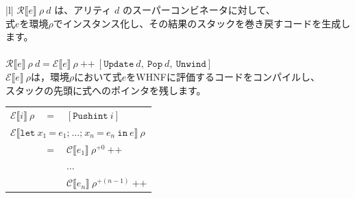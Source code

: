 \documentclass{jbook}
\begin{document}
\begin{tabular} {|l|} \hline
	$\mathcal{R}\llbracket e \rrbracket ~ \rho ~ d$ は、アリティ $d$ のスーパーコンビネータに対して、                                                                          \\
	式$e$を環境$\rho$でインスタンス化し、その結果のスタックを巻き戻すコードを生成します。                                                                                      \\
	\\
	$\mathcal{R} \llbracket e \rrbracket ~ \rho ~ d = \mathcal{E} \llbracket e \rrbracket ~ \rho ~ \texttt{++} ~ [\texttt{Update} ~ d, ~ \texttt{Pop} ~ d, ~ \texttt{Unwind}]$ \\ \hline
	$\mathcal{E} \llbracket e \rrbracket ~ \rho$は，環境$\rho$において式$e$をWHNFに評価するコードをコンパイルし、                                                              \\
	スタックの先頭に式へのポインタを残します。                                                                                                                                 \\
	\begin{tabular}{r c l}
		$\mathcal{E} \llbracket i \rrbracket ~ \rho$                             & $=$ & $\left[\texttt{Pushint} ~ i \right]$                                                                                                                                                         \\
		\multicolumn{3}{l}{$\mathcal{E} \llbracket \texttt{let} ~ x_1 ~ \texttt{=} ~ e_1\texttt{;} ~  \ldots \texttt{;} ~ x_n ~ \texttt{=} ~ e_n ~ \texttt{in} ~ e \rrbracket ~ \rho$}                                                                                                \\
		                                                                         & $=$ & $\mathcal{C} \llbracket e_1 \rrbracket ~ \rho^{+0} ~ \texttt{++}$                                                                                                                            \\
		                                                                         &     & $\ldots$                                                                                                                                                                                     \\
		                                                                         &     & $\mathcal{C} \llbracket e_n \rrbracket ~ \rho^{+(n - 1)} ~ \texttt{++}$                                                                                                                      \\

\end{tabular}
\end{tabular}
\end{document}
